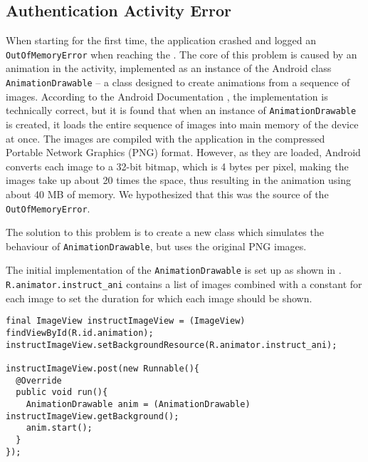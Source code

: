 \subsection{Authentication Activity Error}
When starting \launcher for the first time, the application crashed and logged an \lstinline{OutOfMemoryError} when reaching the \authenticationactivity.
The core of this problem is caused by an animation in the activity, implemented as an instance of the Android class \lstinline{AnimationDrawable} -- a class designed to create animations from a sequence of images.
According to the Android Documentation \citet{androidreference}, the implementation is technically correct, but it is found that when an instance of \lstinline{AnimationDrawable} is created, it loads the entire sequence of images into main memory of the device at once.
The images are compiled with the application in the compressed Portable Network Graphics (PNG) format.
However, as they are loaded, Android converts each image to a 32-bit bitmap, which is 4 bytes per pixel, making the images take up about 20 times the space, thus resulting in the animation using about 40 MB of memory. 
We hypothesized that this was the source of the \lstinline{OutOfMemoryError}.

The solution to this problem is to create a new class which simulates the behaviour of \lstinline{AnimationDrawable}, but uses the original PNG images.

The initial implementation of the \lstinline{AnimationDrawable} is set up as shown in . 
\lstinline{R.animator.instruct_ani} contains a list of images combined with a constant for each image to set the duration for which each image should be shown.



\begin{lstlisting}[caption={The initial implementation, using \lstinline{AnimationDrawable}.},label={lst:animationDrawable}]
final ImageView instructImageView = (ImageView) findViewById(R.id.animation);
instructImageView.setBackgroundResource(R.animator.instruct_ani);

instructImageView.post(new Runnable(){
  @Override
  public void run(){
    AnimationDrawable anim = (AnimationDrawable) instructImageView.getBackground();
    anim.start();
  }
});
\end{lstlisting}

